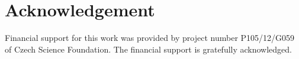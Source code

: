 \section*{Acknowledgement}
Financial support for this work was provided by project number \newline P105/12/G059 of Czech Science Foundation. The financial support is gratefully acknowledged.